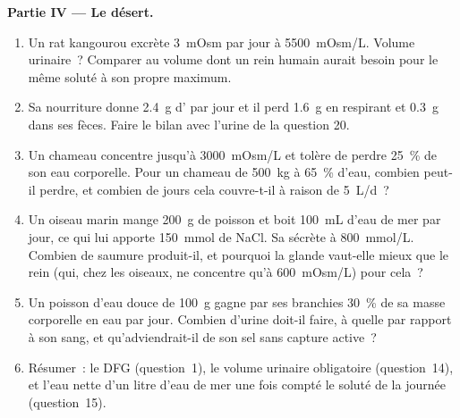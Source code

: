 \begin{problem}
\medskip
\noindent\textbf{Partie IV --- Le désert.}
\begin{enumerate}[resume]
  \item Un rat kangourou excrète \qty{3}{mOsm} par jour à \qty{5500}{mOsm/L}.
        Volume urinaire~? Comparer au volume dont un rein humain aurait
        besoin pour le même soluté à son propre maximum.
  \item Sa nourriture donne \qty{2.4}{g} d' par jour et
        il perd \qty{1.6}{g} en respirant et \qty{0.3}{g} dans ses
        fèces. Faire le bilan avec l'urine de la question 20.
  \item Un chameau concentre jusqu'à \qty{3000}{mOsm/L} et tolère de
        perdre \qty{25}{\%} de son eau corporelle. Pour un chameau de
        \qty{500}{kg} à \qty{65}{\%} d'eau, combien peut-il perdre, et
        combien de jours cela couvre-t-il à raison de \qty{5}{L/d}~?
  \item Un oiseau marin mange \qty{200}{g} de poisson et boit
        \qty{100}{mL} d'eau de mer par jour, ce qui lui apporte
        \qty{150}{mmol} de NaCl. Sa  sécrète à
        \qty{800}{mmol/L}. Combien de saumure produit-il, et pourquoi la
        glande vaut-elle mieux que le rein (qui, chez les oiseaux, ne
        concentre qu'à \qty{600}{mOsm/L}) pour cela~?
  \item Un poisson d'eau douce de \qty{100}{g} gagne par ses branchies
        \qty{30}{\%} de sa masse corporelle en eau par jour. Combien
        d'urine doit-il faire, à quelle  par rapport à son
        sang, et qu'adviendrait-il de son sel sans capture active~?
  \item Résumer~: le DFG (question~1), le volume urinaire obligatoire
        (question~14), et l'eau nette d'un litre d'eau de mer une fois
        compté le soluté de la journée (question~15).
\end{enumerate}
\end{problem}
